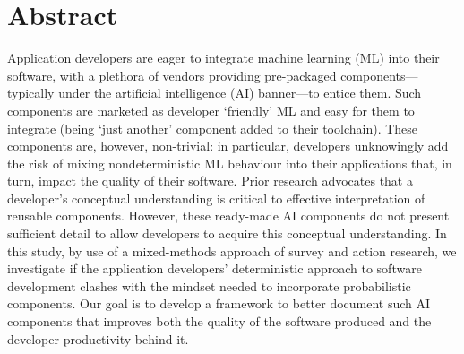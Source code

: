 \chapter*{Abstract}


Application developers are eager to integrate machine learning (ML) into their software, with a plethora of vendors providing pre-packaged components---typically under the artificial intelligence (AI) banner---to entice them.
Such components are marketed as developer `friendly' ML and easy for them to integrate (being `just another' component added to their toolchain). These components are, however, non-trivial: in particular, developers unknowingly add the risk of mixing nondeterministic ML behaviour into their applications that, in turn, impact the quality of their software.
Prior research advocates that a developer's conceptual understanding is critical to effective interpretation of reusable components. However, these ready-made AI components do not present sufficient detail to allow developers to acquire this conceptual understanding.
In this study, by use of a mixed-methods approach of survey and action research, we investigate if the application developers' deterministic approach to software development clashes with the mindset needed to incorporate probabilistic components. Our goal is to develop a framework to better document such AI components that improves both the quality of the software produced and the developer productivity behind it.
